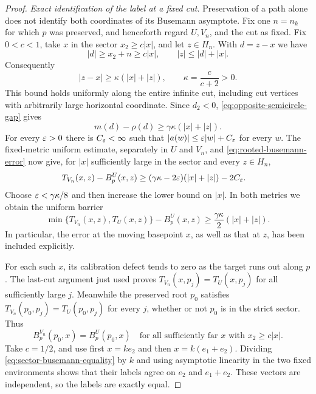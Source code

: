 \begin{proof}
\emph{Exact identification of the label at a fixed cut.}
Preservation of a path alone does not identify both coordinates of
its Busemann asymptote.  Fix one $n=n_k$ for which $p$ was preserved,
and henceforth regard $U,V_n$, and the cut as fixed.  Fix $0<c<1$,
take $x$ in the sector $x_2\ge c|x|$, and let $z\in H_n$.  With
$d=z-x$ we have
\[
 |d|\ge x_2+n\ge c|x|,
 \qquad |z|\le|d|+|x|.
\]
Consequently
\begin{equation}
 |z-x|\ge\kappa(|x|+|z|),\qquad
 \kappa=\frac{c}{c+2}>0.
 \label{eq:fixed-cut-comparability}
\end{equation}
This bound holds uniformly along the entire infinite cut, including
cut vertices with arbitrarily large horizontal coordinate.  Since
$d_2<0$, \eqref{eq:opposite-semicircle-gap} gives
\[
 m(d)-\rho(d)\ge\gamma\kappa(|x|+|z|).
\]
For every $\varepsilon>0$ there is $C_\varepsilon<\infty$ such that
$|a(w)|\le\varepsilon|w|+C_\varepsilon$ for every $w$.  The fixed-metric uniform
estimate, separately in $U$ and $V_n$, and
\eqref{eq:rooted-busemann-error} now give, for $|x|$ sufficiently
large in the sector and every $z\in H_n$,
\begin{align*}
 T_{V_n}(x,z)-B_p^U(x,z)
 &\ge (\gamma\kappa-2\varepsilon)(|x|+|z|)-2C_\varepsilon.
\end{align*}
Choose $\varepsilon<\gamma\kappa/8$ and then increase the lower bound on
$|x|$.  In both metrics we obtain the uniform barrier
\begin{equation}
 \min\{T_{V_n}(x,z),T_U(x,z)\}-B_p^U(x,z)
 \ge\frac{\gamma\kappa}{2}(|x|+|z|).
 \label{eq:fixed-cut-positive-barrier}
\end{equation}
In particular, the error at the moving basepoint $x$, as well as
that at $z$, has been included explicitly.

For each such $x$, its calibration defect tends to zero as the
target runs out along $p$.  The last-cut argument just used proves
$T_{V_n}(x,p_j)=T_U(x,p_j)$ for all sufficiently large $j$.
Meanwhile the preserved root $p_0$ satisfies
$T_{V_n}(p_0,p_j)=T_U(p_0,p_j)$ for every $j$, whether or not $p_0$
is in the strict sector.  Thus
\begin{equation}
 B_p^{V_n}(p_0,x)=B_p^U(p_0,x)
 \quad\text{for all sufficiently far }x\text{ with }x_2\ge c|x|.
 \label{eq:sector-busemann-equality}
\end{equation}
Take $c=1/2$, and use first $x=ke_2$ and then
$x=k(e_1+e_2)$.  Dividing \eqref{eq:sector-busemann-equality} by $k$
and using asymptotic linearity in the two fixed environments shows
that their labels agree on $e_2$ and $e_1+e_2$.  These vectors are
independent, so the labels are exactly equal.


\end{proof}
